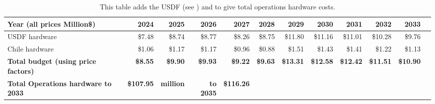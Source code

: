 \tiny \begin{longtable} { |p{}  |r  |r  |r  |r  |r  |r  |r  |r  |r  |r  |r |} 
\caption{This table adds the USDF (see ) and  to give total operations hardware costs. \label{tab:opsSummary}}\\ 
\hline 
\textbf{Year  (all prices Million\$)}&\textbf{2024}&\textbf{2025}&\textbf{2026}&\textbf{2027}&\textbf{2028}&\textbf{2029}&\textbf{2030}&\textbf{2031}&\textbf{2032}&\textbf{2033} \\ \hline
{USDF hardware}&{\$7.48}&{\$8.74}&{\$8.77}&{\$8.26}&{\$8.75}&{\$11.80}&{\$11.16}&{\$11.01}&{\$10.28}&{\$9.76} \\ \hline
{Chile hardware}&{\$1.06}&{\$1.17}&{\$1.17}&{\$0.96}&{\$0.88}&{\$1.51}&{\$1.43}&{\$1.41}&{\$1.22}&{\$1.13} \\ \hline
\textbf{Total budget (using price factors)}&\textbf{\$8.55}&\textbf{\$9.90}&\textbf{\$9.93}&\textbf{\$9.22}&\textbf{\$9.63}&\textbf{\$13.31}&\textbf{\$12.58}&\textbf{\$12.42}&\textbf{\$11.51}&\textbf{\$10.90} \\ \hline
\textbf{Total Operations hardware to 2033}&\textbf{\$107.95}&\textbf{million}&\textbf{to 2035}&\textbf{\$116.26}&&&&&& \\ \hline
\end{longtable} \normalsize
